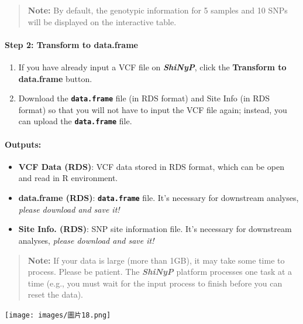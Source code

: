 \documentclass[
]{book}
\begin{document}
\begin{quote}
\textbf{Note:} By default, the genotypic information for 5 samples and 10 SNPs will be displayed on the interactive table.
\end{quote}

\paragraph*{Step 2: Transform to data.frame}\label{step-2-transform-to-data.frame}

\begin{enumerate}
\def\labelenumi{\arabic{enumi}.}
\item
  If you have already input a VCF file on {\textbf{\emph{ShiNyP}}}, click the {\textbf{Transform to data.frame}} button.
\item
  Download the {\textbf{\texttt{data.frame}}} file (in RDS format) and Site Info (in RDS format) so that you will not have to input the VCF file again; instead, you can upload the {\textbf{\texttt{data.frame}}} file.
\end{enumerate}

\paragraph*{Outputs:}\label{outputs}

\begin{itemize}
\item
  \textbf{VCF Data (RDS)}: VCF data stored in RDS format, which can be open and read in R environment.
\item
  \textbf{data.frame (RDS)}: {\textbf{\texttt{data.frame}}} file. It's necessary for downstream analyses, \emph{please download and save it!}
\item
  \textbf{Site Info. (RDS)}: SNP site information file. It's necessary for downstream analyses, \emph{please download and save it!}
\end{itemize}

\begin{quote}
\textbf{Note:} If your data is large (more than 1GB), it may take some time to process. Please be patient. The {\textbf{\emph{ShiNyP}}} platform processes one task at a time (e.g., you must wait for the input process to finish before you can reset the data).
\end{quote}

\texttt{[image: images/圖片18.png]}
\end{document}
